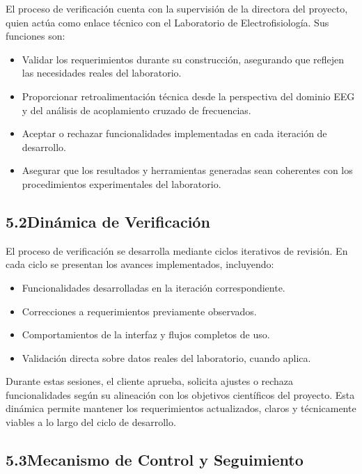 \documentclass[12pt, letterpaper]{article}
\begin{document}
El proceso de verificación cuenta con la supervisión de la directora del proyecto, quien
actúa como enlace técnico con el Laboratorio de Electrofisiología. Sus funciones son:

\begin{itemize}[leftmargin=1.5em,itemsep=3pt]
  \item Validar los requerimientos durante su construcción, asegurando que reflejen las
        necesidades reales del laboratorio.
  \item Proporcionar retroalimentación técnica desde la perspectiva del dominio EEG y del
        análisis de acoplamiento cruzado de frecuencias.
  \item Aceptar o rechazar funcionalidades implementadas en cada iteración de desarrollo.
  \item Asegurar que los resultados y herramientas generadas sean coherentes con los
        procedimientos experimentales del laboratorio.
\end{itemize}

\subsection*{5.2\quad Dinámica de Verificación}

El proceso de verificación se desarrolla mediante ciclos iterativos de revisión. En cada
ciclo se presentan los avances implementados, incluyendo:

\begin{itemize}[leftmargin=1.5em,itemsep=3pt]
  \item Funcionalidades desarrolladas en la iteración correspondiente.
  \item Correcciones a requerimientos previamente observados.
  \item Comportamientos de la interfaz y flujos completos de uso.
  \item Validación directa sobre datos reales del laboratorio, cuando aplica.
\end{itemize}

Durante estas sesiones, el cliente aprueba, solicita ajustes o rechaza funcionalidades
según su alineación con los objetivos científicos del proyecto. Esta dinámica permite
mantener los requerimientos actualizados, claros y técnicamente viables a lo largo del
ciclo de desarrollo.

\subsection*{5.3\quad Mecanismo de Control y Seguimiento}
\end{document}

